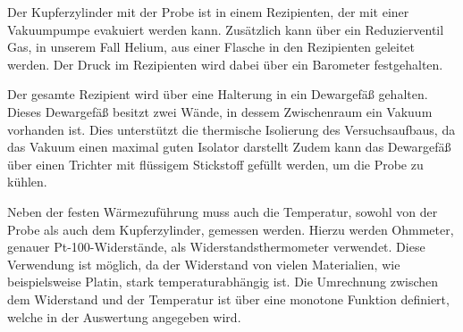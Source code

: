 Der Kupferzylinder mit der Probe ist in einem Rezipienten, der mit einer Vakuumpumpe evakuiert werden kann.
Zusätzlich kann über ein Reduzierventil Gas, in unserem Fall Helium, aus einer Flasche in den Rezipienten geleitet werden.
Der Druck im Rezipienten wird dabei über ein Barometer festgehalten.

Der gesamte Rezipient wird über eine Halterung in ein Dewargefäß gehalten.
Dieses Dewargefäß besitzt zwei Wände, in dessem Zwischenraum ein Vakuum vorhanden ist.
Dies unterstützt die thermische Isolierung des Versuchsaufbaus, da das Vakuum einen maximal guten Isolator darstellt %
Zudem kann das Dewargefäß über einen Trichter mit flüssigem Stickstoff gefüllt werden, um die Probe zu kühlen.

Neben der festen Wärmezuführung muss auch die Temperatur, sowohl von der Probe als auch dem Kupferzylinder, gemessen werden.
Hierzu werden Ohmmeter, genauer Pt-100-Widerstände, als Widerstandsthermometer verwendet.
Diese Verwendung ist möglich, da der Widerstand von vielen Materialien, wie beispielsweise Platin, stark temperaturabhängig ist.
Die Umrechnung zwischen dem Widerstand und der Temperatur ist über eine monotone Funktion definiert, welche in der Auswertung angegeben wird.
